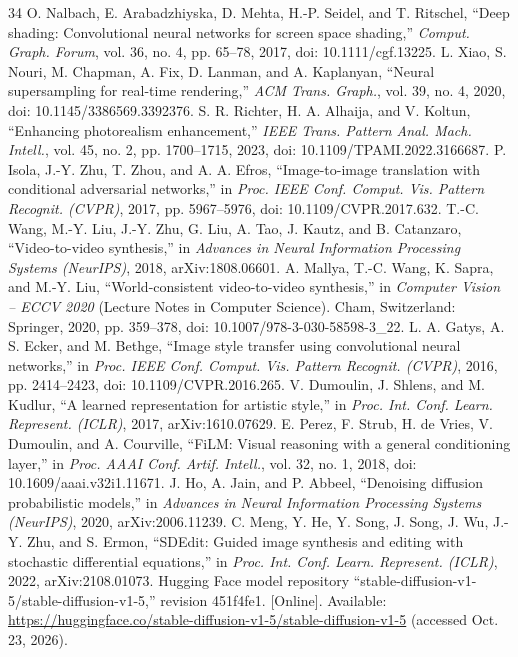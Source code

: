 \documentclass[conference]{IEEEtran}
\begin{document}
\begin{thebibliography}{34}
 O. Nalbach, E. Arabadzhiyska, D. Mehta, H.-P. Seidel, and T. Ritschel, ``Deep shading: Convolutional neural networks for screen space shading,'' \textit{Comput. Graph. Forum}, vol. 36, no. 4, pp. 65–78, 2017, doi: 10.1111/cgf.13225.
 L. Xiao, S. Nouri, M. Chapman, A. Fix, D. Lanman, and A. Kaplanyan, ``Neural supersampling for real-time rendering,'' \textit{ACM Trans. Graph.}, vol. 39, no. 4, 2020, doi: 10.1145/3386569.3392376.
 S. R. Richter, H. A. Alhaija, and V. Koltun, ``Enhancing photorealism enhancement,'' \textit{IEEE Trans. Pattern Anal. Mach. Intell.}, vol. 45, no. 2, pp. 1700–1715, 2023, doi: 10.1109/TPAMI.2022.3166687.
 P. Isola, J.-Y. Zhu, T. Zhou, and A. A. Efros, ``Image-to-image translation with conditional adversarial networks,'' in \textit{Proc. IEEE Conf. Comput. Vis. Pattern Recognit. (CVPR)}, 2017, pp. 5967–5976, doi: 10.1109/CVPR.2017.632.
 T.-C. Wang, M.-Y. Liu, J.-Y. Zhu, G. Liu, A. Tao, J. Kautz, and B. Catanzaro, ``Video-to-video synthesis,'' in \textit{Advances in Neural Information Processing Systems (NeurIPS)}, 2018, arXiv:1808.06601.
 A. Mallya, T.-C. Wang, K. Sapra, and M.-Y. Liu, ``World-consistent video-to-video synthesis,'' in \textit{Computer Vision – ECCV 2020} (Lecture Notes in Computer Science). Cham, Switzerland: Springer, 2020, pp. 359–378, doi: 10.1007/978-3-030-58598-3\_22.
 L. A. Gatys, A. S. Ecker, and M. Bethge, ``Image style transfer using convolutional neural networks,'' in \textit{Proc. IEEE Conf. Comput. Vis. Pattern Recognit. (CVPR)}, 2016, pp. 2414–2423, doi: 10.1109/CVPR.2016.265.
 V. Dumoulin, J. Shlens, and M. Kudlur, ``A learned representation for artistic style,'' in \textit{Proc. Int. Conf. Learn. Represent. (ICLR)}, 2017, arXiv:1610.07629.
 E. Perez, F. Strub, H. de Vries, V. Dumoulin, and A. Courville, ``FiLM: Visual reasoning with a general conditioning layer,'' in \textit{Proc. AAAI Conf. Artif. Intell.}, vol. 32, no. 1, 2018, doi: 10.1609/aaai.v32i1.11671.
 J. Ho, A. Jain, and P. Abbeel, ``Denoising diffusion probabilistic models,'' in \textit{Advances in Neural Information Processing Systems (NeurIPS)}, 2020, arXiv:2006.11239.
 C. Meng, Y. He, Y. Song, J. Song, J. Wu, J.-Y. Zhu, and S. Ermon, ``SDEdit: Guided image synthesis and editing with stochastic differential equations,'' in \textit{Proc. Int. Conf. Learn. Represent. (ICLR)}, 2022, arXiv:2108.01073.
 Hugging Face model repository ``stable-diffusion-v1-5/stable-diffusion-v1-5,'' revision 451f4fe1. [Online]. Available: \url{https://huggingface.co/stable-diffusion-v1-5/stable-diffusion-v1-5} (accessed Oct. 23, 2026).

\end{thebibliography}
\end{document}
